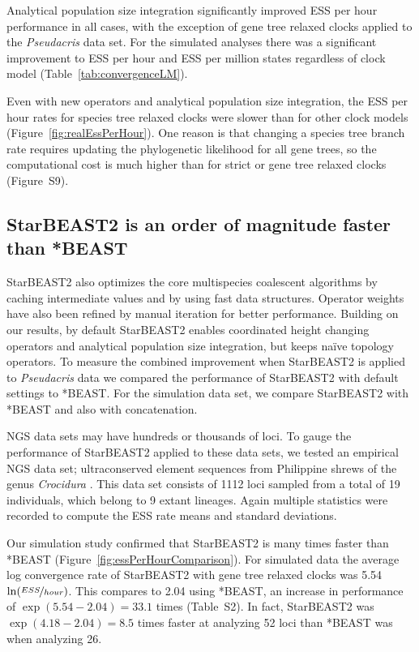 \documentclass[12pt]{article}
\begin{document}
Analytical population size integration significantly improved ESS per hour
performance in all cases, with the exception of gene tree relaxed clocks
applied to the \textit{Pseudacris} data set. For the simulated analyses there
was a significant improvement to ESS per hour and ESS per million states
regardless of clock model (Table~\ref{tab:convergenceLM}).

Even with new operators and analytical population size integration, the ESS
per hour rates for species tree relaxed clocks were slower than for other
clock models (Figure~\ref{fig:realEssPerHour}). One reason is that changing a
species tree branch rate requires updating the phylogenetic likelihood for all
gene trees, so the computational cost is much higher than for strict or gene
tree relaxed clocks (Figure~S9).

\subsection{StarBEAST2 is an order of magnitude faster than *BEAST}

StarBEAST2 also optimizes the core multispecies coalescent algorithms by
caching intermediate values and by using fast data structures. Operator
weights have also been refined by manual iteration for better performance.
Building on our results, by default StarBEAST2 enables coordinated height
changing operators and analytical population size integration, but keeps
na\"ive topology operators. To measure the combined improvement when
StarBEAST2 is applied to \textit{Pseudacris} data we compared the performance
of StarBEAST2 with default settings to *BEAST. For the simulation data set, we
compare StarBEAST2 with *BEAST and also with concatenation.

NGS data sets may have hundreds or thousands of loci. To gauge the performance
of StarBEAST2 applied to these data sets, we tested an empirical NGS data set;
ultraconserved element \citep[UCE;][]{Faircloth01102012} sequences from
Philippine shrews of the genus \textit{Crocidura} \citep{Giarla01092015}. This
data set consists of 1112 loci sampled from a total of 19 individuals, which
belong to 9 extant lineages. Again multiple statistics were recorded to
compute the ESS rate means and standard deviations.

Our simulation study confirmed that StarBEAST2 is many times faster than
*BEAST (Figure~\ref{fig:essPerHourComparison}). For simulated data the average
log convergence rate of StarBEAST2 with gene tree relaxed clocks was 5.54
$\ln(\nicefrac{ESS}{hour})$. This compares to 2.04 using *BEAST, an
increase in performance of $\exp(5.54 - 2.04) = 33.1$ times (Table~S2). In
fact, StarBEAST2 was
$\exp(4.18 - 2.04) = 8.5$ times faster at analyzing 52 loci than *BEAST
was when analyzing 26.
\end{document}
